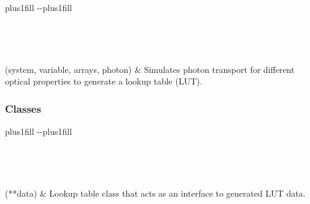 \documentclass[letterpaper,10pt,english]{sphinxmanual}
\begin{document}
\begin{savenotes}
\sphinxatlongtablestart
\sphinxthistablewithglobalstyle
\sphinxthistablewithnovlinesstyle
\makeatletter
  \LTleft \@totalleftmargin plus1fill
  \LTright\dimexpr\columnwidth-\@totalleftmargin-\linewidth\relax plus1fill
\makeatother
\begin{longtable}{}
\sphinxtoprule
\endfirsthead

\\
\sphinxtoprule
\endhead

\sphinxbottomrule
{}\\
\endfoot

\endlastfoot
\sphinxtableatstartofbodyhook

\sphinxAtStartPar
{\hyperref[\detokenize{generated/photon_canon.lut.lut:photon_canon.lut.lut.generate_lut}]{}}(system, variable, arrays, photon)
&
\sphinxAtStartPar
Simulates photon transport for different optical properties to generate a lookup table (LUT).
\\
\sphinxbottomrule
\end{longtable}
\sphinxtableafterendhook
\sphinxatlongtableend
\end{savenotes}
\subsubsection*{Classes}


\begin{savenotes}
\sphinxatlongtablestart
\sphinxthistablewithglobalstyle
\sphinxthistablewithnovlinesstyle
\makeatletter
  \LTleft \@totalleftmargin plus1fill
  \LTright\dimexpr\columnwidth-\@totalleftmargin-\linewidth\relax plus1fill
\makeatother
\begin{longtable}{}
\sphinxtoprule
\endfirsthead

\\
\sphinxtoprule
\endhead

\sphinxbottomrule
{}\\
\endfoot

\endlastfoot
\sphinxtableatstartofbodyhook

\sphinxAtStartPar
{\hyperref[\detokenize{generated/photon_canon.lut.lut:photon_canon.lut.lut.LUT}]{}}(**data)
&
\sphinxAtStartPar
Lookup table class that acts as an interface to generated LUT data.
\\
\sphinxbottomrule
\end{longtable}
\sphinxtableafterendhook
\sphinxatlongtableend
\end{savenotes}
\end{document}

